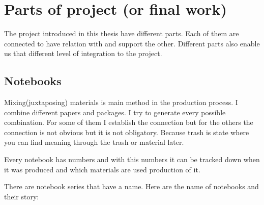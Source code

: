 



%
%
\section{Parts of project (or final work)}
The project introduced in this thesis have different parts. Each of them are connected to have relation with and support the other. Different parts also enable us that different level of integration to the project. 





%
%
\subsection{Notebooks}
Mixing(juxtaposing) materials is main method in the production process. I combine different papers and packages. I try to generate every possible combination. For some of them I establish the connection but for the others the connection is not obvious but it is not obligatory. Because trash is state where you can find meaning through the trash or material later. 

Every notebook has numbers and with this numbers it can be tracked down when it was produced and which materials are used production of it.

There are notebook series that have a name. Here are the name of notebooks and their story:

